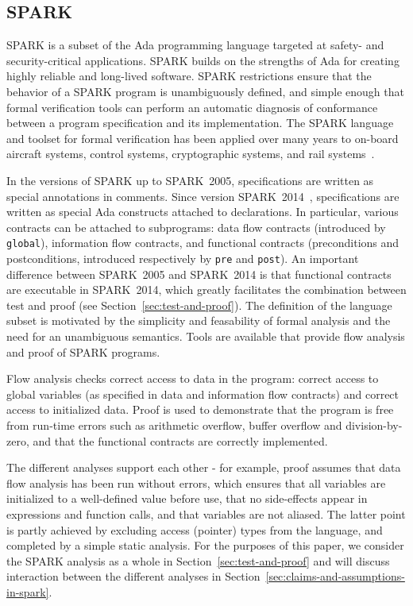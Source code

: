 \documentclass{llncs}
\newcommand{\oldspark}{SPARK~2005\xspace}
\newcommand{\newspark}{SPARK~2014\xspace}
\newcommand{\spark}{SPARK\xspace}
\begin{document}
\subsection{\spark}
\label{sec:spark}

\spark is a subset of the Ada programming language targeted at safety-
and security-critical applications. \spark builds on the strengths of
Ada for creating highly reliable and long-lived software. \spark
restrictions ensure that the behavior of a \spark program is
unambiguously defined, and simple enough that formal verification
tools can perform an automatic diagnosis of conformance between a
program specification and its implementation. The \spark language and
toolset for formal verification has been applied over many years to
on-board aircraft systems, control systems, cryptographic systems, and
rail systems~\cite{sparkbook2012,oneill2012}.

In the versions of \spark up to \oldspark, specifications are written as
special annotations in comments. Since version \newspark~\cite{sparkERTS2014},
specifications are written as special Ada constructs attached to
declarations. In particular, various contracts can be attached to subprograms:
data flow contracts (introduced by \texttt{global}), information flow contracts,
and functional contracts (preconditions and postconditions, introduced
respectively by \texttt{pre} and \texttt{post}). An important difference
between \oldspark and \newspark is that functional contracts are executable in
\newspark, which greatly facilitates the combination between test and proof
(see Section~\ref{sec:test-and-proof}). The definition of the language subset
is motivated by the simplicity and feasability of formal analysis and the need
for an unambiguous semantics. Tools are available that provide flow analysis
and proof of \spark programs.

Flow analysis checks correct access to data in the program: correct access to
global variables (as specified in data and information flow contracts) and
correct access to initialized data. Proof is used to demonstrate that the
program is free from run-time errors such as arithmetic overflow, buffer
overflow and division-by-zero, and that the functional contracts are correctly
implemented.

The different analyses support each other - for example, proof assumes that
data flow analysis has been run without errors, which ensures that all
variables are initialized to a well-defined value before use, that no
side-effects appear in expressions and function calls, and that variables are
not aliased. The latter point is partly achieved by excluding access (pointer)
types from the language, and completed by a simple static analysis. For the
purposes of this paper, we consider the \spark analysis as a whole in
Section~\ref{sec:test-and-proof} and will discuss interaction between the
different analyses in Section~\ref{sec:claims-and-assumptions-in-spark}.
\end{document}
